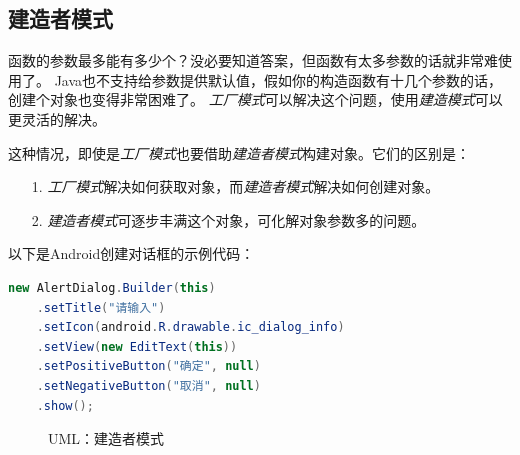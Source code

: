 \subsection{建造者模式}
函数的参数最多能有多少个？没必要知道答案，但函数有太多参数的话就非常难使用了。
Java也不支持给参数提供默认值，假如你的构造函数有十几个参数的话，创建个对象也变得非常困难了。
\emph{工厂模式}可以解决这个问题，使用\emph{建造模式}可以更灵活的解决。
\vspace{0.3cm}

\noindent
这种情况，即使是\emph{工厂模式}也要借助\emph{建造者模式}构建对象。它们的区别是：
\begin{itemize}
\item [1.] \emph{工厂模式}解决如何获取对象，而\emph{建造者模式}解决如何创建对象。
\item [2.] \emph{建造者模式}可逐步丰满这个对象，可化解对象参数多的问题。
\end{itemize}

\noindent
以下是Android创建对话框的示例代码：
\begin{lstlisting}[language=Java,mathescape]
new AlertDialog.Builder(this)
    .setTitle("请输入")
    .setIcon(android.R.drawable.ic_dialog_info)
    .setView(new EditText(this))
    .setPositiveButton("确定", null)
    .setNegativeButton("取消", null)
    .show();
\end{lstlisting}

\begin{figure}[!htb]
\begin{center}
\end{center}
\caption{UML：建造者模式}
\label{fig:part1_oo_uml_builder}
\end{figure}

